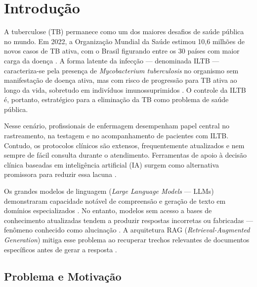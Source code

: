 \documentclass[
  12pt,
  oneside,
  a4paper,
  english,
  brazil
]{abntex2}
\begin{document}
\textual

\chapter{Introdução}
\label{cap:introducao}

A tuberculose (TB) permanece como um dos maiores desafios de saúde pública no
mundo. Em 2022, a Organização Mundial da Saúde estimou 10,6 milhões de novos casos
de TB ativa, com o Brasil figurando entre os 30 países com maior carga da doença
\cite{who2023}. A forma latente da infecção --- denominada ILTB --- caracteriza-se
pela presença de \textit{Mycobacterium tuberculosis} no organismo sem manifestação
de doença ativa, mas com risco de progressão para TB ativa ao longo da vida,
sobretudo em indivíduos imunossuprimidos \cite{who2018}. O controle da ILTB é,
portanto, estratégico para a eliminação da TB como problema de saúde pública.

Nesse cenário, profissionais de enfermagem desempenham papel central no rastreamento,
na testagem e no acompanhamento de pacientes com ILTB. Contudo, os protocolos
clínicos são extensos, frequentemente atualizados e nem sempre de fácil consulta
durante o atendimento. Ferramentas de apoio à decisão clínica baseadas em
inteligência artificial (IA) surgem como alternativa promissora para reduzir essa
lacuna \cite{SHTI2023}.

Os grandes modelos de linguagem (\textit{Large Language Models} --- LLMs)
demonstraram capacidade notável de compreensão e geração de texto em domínios
especializados \cite{brown2020}. No entanto, modelos sem acesso a bases de
conhecimento atualizadas tendem a produzir respostas incorretas ou fabricadas ---
fenômeno conhecido como alucinação \cite{bang2023}. A arquitetura RAG
(\textit{Retrieval-Augmented Generation}) mitiga esse problema ao recuperar trechos
relevantes de documentos específicos antes de gerar a resposta \cite{lewis2021,
gao2024}.

\section{Problema e Motivação}
\end{document}
